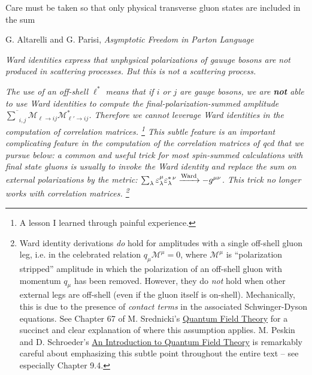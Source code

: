 \vspace{-20pt}
\epigraph{Care must be taken so that only physical transverse gluon states are included in the sum}{G. Altarelli and G. Parisi, \textit{Asymptotic Freedom in Parton Language} \cite{Altarelli:1977zs}}
\endgroup

\vspace{-5pt}
\noindent
\textit{
    Ward identities express that unphysical polarizations of gauuge bosons are not produced in scattering processes.
    But this is not a scattering process.
}

\textit{
    The use of an off-shell \(\ell^*\) means that if \(i\) or \(j\) are gauge bosons, we are \textbf{not} able to use Ward identities to compute the final-polarization-summed amplitude \(\overline{\sum}_{i,j} \mathcal{M}_{\ell \to ij} \mathcal{M}^*_{\ell' \to ij}\).
    Therefore we cannot leverage Ward identities in the computation of correlation matrices.%
    \footnote{
        A lesson I learned through painful experience.
    }
    This subtle feature is an important complicating feature in the computation of the correlation matrices of \gls{qcd} that we pursue below:
    a common and useful trick for \emph{most} spin-summed calculations with final state gluons is \emph{usually} to invoke the Ward identity and replace the sum on external polarizations by the metric:
    \(\sum_\lambda \varepsilon^\mu_\lambda \varepsilon^{*\,\nu}_\lambda \xrightarrow[]{\rm Ward} - g^{\mu\nu}\).
    This trick no longer works with correlation matrices.%
    \footnote{
        Ward identity derivations \emph{do} hold for amplitudes with a single off-shell gluon leg, i.e. in the celebrated relation \(q_\mu \mathcal{M}^\mu = 0\), where \(\mathcal{M}^\mu\) is ``polarization stripped'' amplitude in which the polarization of an off-shell gluon with momentum \(q_\mu\) has been removed.
        However, they do \emph{not} hold when other external legs are off-shell (even if the gluon itself is on-shell).
        Mechanically, this is due to the presence of \emph{contact terms} in the associated Schwinger-Dyson equations.
        See Chapter 67 of M. Srednicki's \underline{Quantum Field Theory} \cite{Srednicki:2007qs} for a succinct and clear explanation of where this assumption applies.
        M. Peskin and D. Schroeder's \underline{An Introduction to Quantum Field Theory} \cite{Peskin:1995ev} is remarkably careful about emphasizing this subtle point throughout the entire text -- see especially Chapter 9.4.
    }
}


